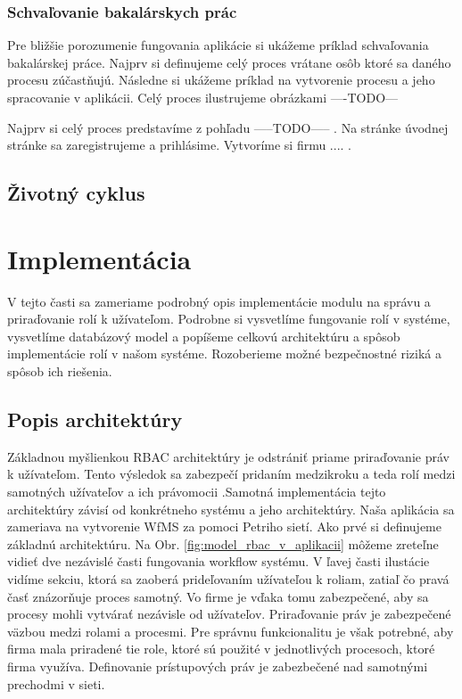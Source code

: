 	\subsubsection{Schvaľovanie bakalárskych prác}
	Pre bližšie porozumenie fungovania aplikácie si ukážeme príklad schvaľovania bakalárskej práce. Najprv si definujeme celý proces vrátane osôb ktoré sa daného procesu zúčastňujú. Následne si ukážeme príklad na vytvorenie procesu a jeho spracovanie v aplikácii. Celý proces ilustrujeme obrázkami 
	----TODO---
	
	Najprv si celý proces predstavíme z pohľadu -----TODO----- . Na stránke úvodnej stránke sa zaregistrujeme a prihlásime. Vytvoríme si firmu .... . 
		
	
	\subsection{Životný cyklus}
	

\section{Implementácia}
V tejto časti sa zameriame podrobný opis implementácie modulu na správu a priraďovanie rolí k užívateľom. Podrobne si vysvetlíme fungovanie rolí v systéme, vysvetlíme databázový model a popíšeme celkovú architektúru a spôsob implementácie rolí v našom systéme. Rozoberieme možné bezpečnostné riziká a spôsob ich riešenia.

	\subsection{Popis architektúry}
	Základnou myšlienkou RBAC architektúry je odstrániť priame priraďovanie práv k užívateľom. Tento výsledok sa zabezpečí pridaním medzikroku a teda rolí medzi samotných užívateľov a ich právomocii .Samotná implementácia tejto architektúry závisí od konkrétneho systému a jeho architektúry. Naša aplikácia sa zameriava na vytvorenie WfMS za pomoci Petriho sietí. Ako prvé si definujeme základnú architektúru. Na Obr. \ref{fig:model_rbac_v_aplikacii} môžeme zreteľne vidieť dve nezávislé časti fungovania workflow systému. V ľavej časti ilustácie vidíme sekciu, ktorá sa zaoberá  prideľovaním  užívateľou k roliam, zatiaľ čo pravá časť znázorňuje proces samotný. Vo firme je vďaka tomu zabezpečené, aby sa procesy mohli vytvárať nezávisle od užívateľov. Priraďovanie práv je zabezpečené väzbou medzi rolami a procesmi. Pre správnu funkcionalitu je však potrebné, aby firma mala priradené tie role, ktoré sú použité v jednotlivých procesoch, ktoré firma využíva. Definovanie prístupových práv je zabezbečené nad samotnými prechodmi v sieti.
	
